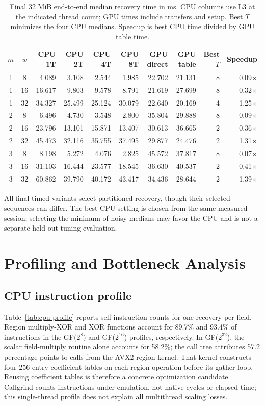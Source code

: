 \documentclass[conference]{IEEEtran}
\begin{document}
\begin{table}[t]
\caption{Final 32 MiB end-to-end median recovery time in ms. CPU columns use L3 at the indicated thread count; GPU times include transfers and setup. Best $T$ minimizes the four CPU medians. Speedup is best CPU time divided by GPU table time.}
\label{tab:final}
\centering
\small
\setlength{\tabcolsep}{6pt}
\begin{tabular}{ccrrrrrrrr}
\hline
$m$ & $w$ & CPU 1T & CPU 2T & CPU 4T & CPU 8T & GPU direct & GPU table & Best $T$ & Speedup\\
\hline
1&8&4.089&3.108&2.544&1.985&22.702&21.131&8&0.09$\times$\\
1&16&16.617&9.803&9.578&8.791&21.619&27.699&8&0.32$\times$\\
1&32&34.327&25.499&25.124&30.079&22.640&20.169&4&1.25$\times$\\
2&8&6.496&4.730&3.548&2.800&35.804&29.888&8&0.09$\times$\\
2&16&23.796&13.101&15.871&13.407&30.613&36.665&2&0.36$\times$\\
2&32&45.473&32.116&35.755&37.495&29.877&24.476&2&1.31$\times$\\
3&8&8.198&5.272&4.076&2.825&45.572&37.817&8&0.07$\times$\\
3&16&31.103&16.444&23.577&18.545&36.630&40.537&2&0.41$\times$\\
3&32&60.862&39.790&40.172&43.417&34.436&28.644&2&1.39$\times$\\
\hline
\end{tabular}
\end{table}

All final timed variants select partitioned recovery, though their selected sequences can differ. The best CPU setting is chosen from the same measured session; selecting the minimum of noisy medians may favor the CPU and is not a separate held-out tuning evaluation.

\section{Profiling and Bottleneck Analysis}
\subsection{CPU instruction profile}
Table~\ref{tab:cpu-profile} reports self instruction counts for one recovery per field. Region multiply-XOR and XOR functions account for 89.7\% and 93.4\% of instructions in the GF($2^8$) and GF($2^{16}$) profiles, respectively. In GF($2^{32}$), the scalar field-multiply routine alone accounts for 58.2\%; the call tree attributes 57.2 percentage points to calls from the AVX2 region kernel. That kernel constructs four 256-entry coefficient tables on each region operation before its gather loop. Reusing coefficient tables is therefore a concrete optimization candidate. Callgrind counts instructions under emulation, not native cycles or elapsed time; this single-thread profile does not explain all multithread scaling losses.
\end{document}

